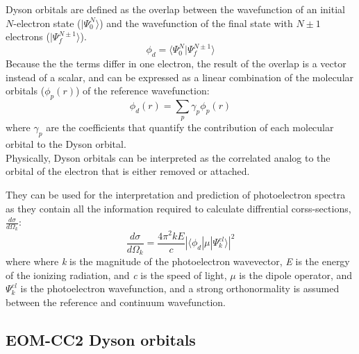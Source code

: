Dyson orbitals are defined as the overlap between the wavefunction of an initial $N$-electron state ($|\Psi_0^N\rangle$) and the wavefunction of the final state with $N\pm1$ electrons ($|\Psi_f^{N\pm1}\rangle$).
\begin{equation}\label{eq:dyson} %
    \phi_{d} = \langle \Psi_0^N | \Psi_f^{N\pm1} \rangle
\end{equation}
Because the the terms differ in one electron, the result of the overlap is a vector instead of a scalar, and can be expressed as a linear combination of the molecular orbitals ($\phi_p(r)$) of the reference wavefunction:
\begin{equation}
    \phi_{d}(r) = \sum_p \gamma_p \phi_p(r)
\end{equation}
where $\gamma_p$ are the coefficients that quantify the contribution of each molecular orbital to the Dyson orbital.\\

Physically, Dyson orbitals can be interpreted as the correlated analog to the orbital of the electron that is either removed or attached. 

They can be used for the interpretation and prediction of photoelectron spectra as they contain all the information required to calculate diffrential corss-sections, $\frac{d\sigma}{d\Omega_k}$:
\begin{equation}
    \frac{d\sigma}{d\Omega_k} = \frac{4\pi^2kE}{c}|\langle \phi_d | \mu | \Psi^{el}_k \rangle |^2
\end{equation}
where where \textit{k} is the magnitude of the photoelectron wavevector, \textit{E} is the energy of the ionizing radiation, and \textit{c} is the speed of light, $\mu$ is the dipole operator, and $\Psi^{el}_k$ is the photoelectron wavefunction, and a strong orthonormality is assumed between the reference and continuum wavefunction.  

\subsection{EOM-CC2 Dyson orbitals}

\cleardoublepage

